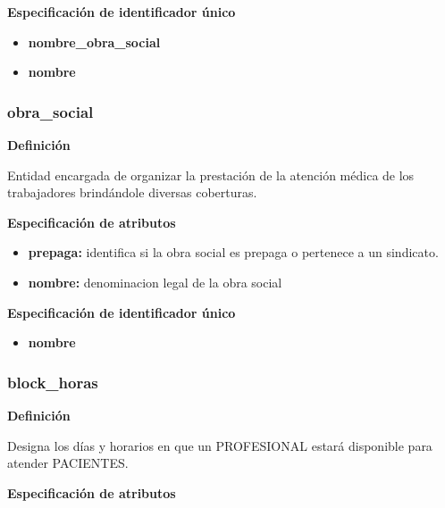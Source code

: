 \documentclass[a4paper,11pt]{article}
\begin{document}
\textbf{Especificación de identificador único}

\begin{itemize}

    \item \textbf{nombre\_obra\_social}

    \item \textbf{nombre}

\end{itemize}

\subsubsection{\textbf{obra\_social}}

\textbf{Definición}

Entidad encargada de organizar la prestación de la atención médica de los 
trabajadores brindándole diversas coberturas.

\textbf{Especificación de atributos}

\begin{itemize}

     \item \textbf{prepaga:} identifica si la obra social es prepaga o pertenece a un sindicato.

     \item \textbf{nombre:} denominacion legal de la obra social

\end{itemize}

\textbf{Especificación de identificador único}

\begin{itemize}

     \item \textbf{nombre}

\end{itemize}

\subsubsection{\textbf{block\_horas}}

\textbf{Definición}

Designa los días y horarios en que un PROFESIONAL estará disponible para atender 
PACIENTES.

\textbf{Especificación de atributos}
\end{document}
